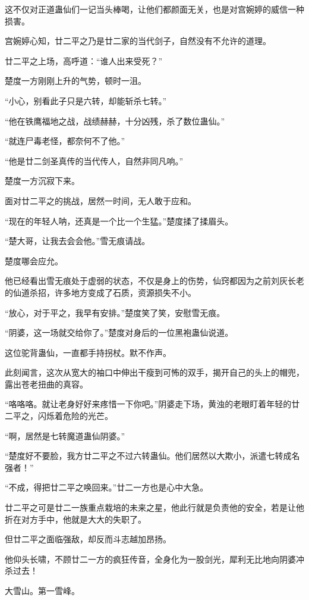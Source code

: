 \begin{this_body}
这不仅对正道蛊仙们一记当头棒喝，让他们都颜面无关，也是对宫婉婷的威信一种损害。

宫婉婷心知，廿二平之乃是廿二家的当代剑子，自然没有不允许的道理。

廿二平之上场，高呼道：“谁人出来受死？”

楚度一方刚刚上升的气势，顿时一沮。

“小心，别看此子只是六转，却能斩杀七转。”

“他在铁鹰福地之战，战绩赫赫，十分凶残，杀了数位蛊仙。”

“就连尸毒老怪，都奈何不了他。”

“他是廿二剑圣真传的当代传人，自然非同凡响。”

楚度一方沉寂下来。

面对廿二平之的挑战，居然一时间，无人敢于应和。

“现在的年轻人呐，还真是一个比一个生猛。”楚度揉了揉眉头。

“楚大哥，让我去会会他。”雪无痕请战。

楚度哪会应允。

他已经看出雪无痕处于虚弱的状态，不仅是身上的伤势，仙窍都因为之前刘灰长老的仙道杀招，许多地方变成了石质，资源损失不小。

“放心，对于平之，我早有安排。”楚度笑了笑，安慰雪无痕。

“阴婆，这一场就交给你了。”楚度对身后的一位黑袍蛊仙说道。

这位驼背蛊仙，一直都手持拐杖。默不作声。

此刻闻言，这次从宽大的袖口中伸出干瘦到可怖的双手，揭开自己的头上的帽兜，露出苍老扭曲的真容。

“咯咯咯。就让老身好好来疼惜一下你吧。”阴婆走下场，黄浊的老眼盯着年轻的廿二平之，闪烁着危险的光芒。

“啊，居然是七转魔道蛊仙阴婆。”

“楚度好不要脸，我方廿二平之不过六转蛊仙。他们居然以大欺小，派遣七转成名强者！”

“不成，得把廿二平之唤回来。”廿二一方也是心中大急。

廿二平之可是廿二一族重点栽培的未来之星，他此行就是负责他的安全，若是让他折在对方手中，他就是大大的失职了。

但廿二平之面临强敌，却反而斗志越加昂扬。

他仰头长啸，不顾廿二一方的疯狂传音，全身化为一股剑光，犀利无比地向阴婆冲杀过去！

大雪山。第一雪峰。


\end{this_body}
